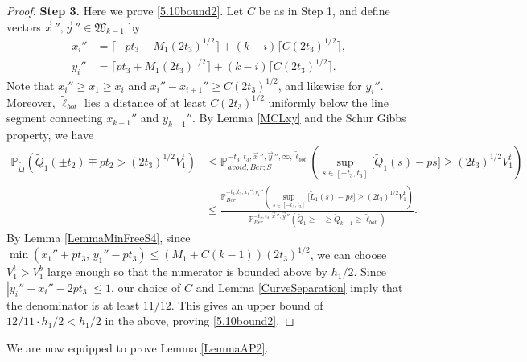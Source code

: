 \begin{proof}
	\noindent\textbf{Step 3.} Here we prove \eqref{5.10bound2}. Let $C$ be as in Step 1, and define vectors $\vec{x}\,'', \vec{y}\,''\in\mathfrak{W}_{k-1}$ by
	\begin{align*}
	x_i'' &= \lceil -pt_3 + M_1(2t_3)^{1/2}\rceil + (k-i)\lceil C(2t_3)^{1/2}\rceil,\\
	y_i'' &= \lceil pt_3 + M_1(2t_3)^{1/2}\rceil + (k-i)\lceil C(2t_3)^{1/2}\rceil.
	\end{align*}
	Note that $x_i'' \geq x_1 \geq x_i$ and $x_i''-x_{i+1}'' \geq C(2t_3)^{1/2}$, and likewise for $y_i''$. Moreover, $\tilde{\ell}_{bot}$ lies a distance of at least $C(2t_3)^{1/2}$ uniformly below the line segment connecting $x_{k-1}''$ and $y_{k-1}''$. By Lemma \ref{MCLxy} and the Schur Gibbs property, we have
	\begin{align*}
	\mathbb{P}_{\tilde{\mathfrak{Q}}}\left(\tilde{Q}_1(\pm t_2) \mp pt_2 > (2t_3)^{1/2}V_1^t\right) &\leq \mathbb{P}^{-t_3,t_3,\vec{x}\,'',\vec{y}\,'',\infty,\tilde{\ell}_{bot}}_{avoid,Ber;S}\left(\sup_{s\in[-t_3,t_3]} \big[\tilde{Q}_1(s)-ps\big] \geq (2t_3)^{1/2}V_1^t\right)\\
	&\leq \frac{\mathbb{P}^{-t_3,t_3,x_1'',y_1''}_{Ber}\left(\sup_{s\in[-t_3,t_3]} \big[\tilde{L}_1(s)-ps\big] \geq (2t_3)^{1/2}V_1^t\right)}{\mathbb{P}^{-t_3,t_3,\vec{x}\,'',\vec{y}\,''}_{Ber}\left(\tilde{Q}_1\geq\cdots\geq\tilde{Q}_{k-1}\geq\tilde{\ell}_{bot}\right)}.
	\end{align*}
	By Lemma \ref{LemmaMinFreeS4}, since $\min(x_1'' + pt_3, \, y_1'' - pt_3) \leq (M_1+C(k-1))(2t_3)^{1/2}$, we can choose $V_1^t > V_1^b$ large enough so that the numerator is bounded above by $h_1/2$. Since $|y_i'' - x_i'' - 2pt_3| \leq 1$, our choice of $C$ and Lemma \ref{CurveSeparation} imply that the denominator is at least $11/12$. This gives an upper bound of $12/11\cdot h_1/2 < h_1/2$ in the above, proving \eqref{5.10bound2}.
	
	
\end{proof}

We are now equipped to prove Lemma \ref{LemmaAP2}.

